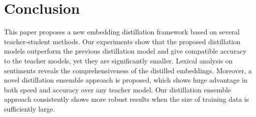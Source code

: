 \documentclass{article}
\begin{document}
 \vspace{-0.5ex}
\section{Conclusion}
This paper proposes a new embedding distillation framework based on several teacher-student methods.
Our experiments show that the proposed distillation models outperform the previous distillation model and give compatible accuracy to the teacher models, yet they are significantly smaller.
Lexical analysis on sentiments reveals the comprehensiveness of the distilled embeddings.
Moreover, a novel distillation ensemble approach is proposed, which shows huge advantage in both speed and accuracy over any teacher model.
Our distillation ensemble approach consistently shows more robust results when the size of training data is sufficiently large.




 




\appendix
\end{document}

